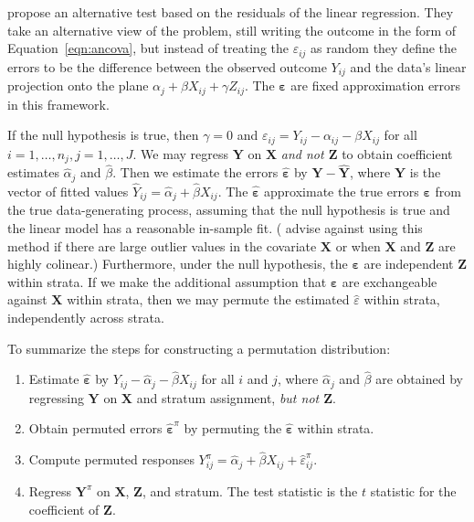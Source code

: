 \documentclass[12pt]{article}
\begin{document}
\citet{freedman_nonstochastic_1983} propose an alternative test based on the residuals of the linear regression.
They take an alternative view of the problem, still writing the outcome in the form of Equation~\ref{eqn:ancova}, but instead of treating the $\varepsilon_{ij}$ as random they define the errors to be the difference between the observed outcome $Y_{ij}$ and the data's linear projection onto the plane $\alpha_j + \beta X_{ij}+ \gamma Z_{ij}$.
The $\mathbf{\varepsilon}$ are fixed approximation errors in this framework.

If the null hypothesis is true, then $\gamma = 0$ and $\varepsilon_{ij} = Y_{ij} - \alpha_{ij} - \beta X_{ij}$ for all $i = 1, \dots, n_j, j = 1, \dots, J$.
We may regress $\mathbf{Y}$ on $\mathbf{X}$ \textit{and not $\mathbf{Z}$} to obtain coefficient estimates $\hat{\alpha}_j$ and $\hat{\beta}$.
Then we estimate the errors $\mathbf{\hat{\varepsilon}}$ by $\mathbf{Y} - \mathbf{\hat{Y}}$, where $\mathbf{\hat{Y}}$ is the vector of fitted values $\hat{Y}_{ij} = \hat{\alpha}_j + \hat{\beta}X_{ij}$.
The $\mathbf{\hat{\varepsilon}}$ approximate the true errors $\mathbf{\varepsilon}$ from the true data-generating process, assuming that the null hypothesis is true and the linear model has a reasonable in-sample fit.
(\cite{freedman_nonstochastic_1983} advise against using this method if there are large outlier values in the covariate $\mathbf{X}$ or when $\mathbf{X}$ and $\mathbf{Z}$ are highly colinear.)
Furthermore, under the null hypothesis, the $\mathbf{\varepsilon}$ are independent $\mathbf{Z}$ within strata. 
If we make the additional assumption that $\mathbf{\varepsilon}$ are exchangeable against $\mathbf{X}$ within strata, then 
we may permute the estimated $\hat{\varepsilon}$ within strata, independently across strata.

To summarize the steps for constructing a permutation distribution:

\begin{enumerate}
\item Estimate $\mathbf{\hat{\varepsilon}}$ by $Y_{ij} - \hat{\alpha}_j - \hat{\beta} X_{ij}$ for all $i$ and $j$, where $\hat{\alpha}_j$ and $\hat{\beta}$ are obtained by regressing $\mathbf{Y}$ on $\mathbf{X}$ and stratum assignment, \textit{but not $\mathbf{Z}$}.
\item Obtain permuted errors $\mathbf{\hat{\varepsilon}}^\pi$ by permuting the $\mathbf{\hat{\varepsilon}}$ within strata.
\item Compute permuted responses $Y_{ij}^\pi = \hat{\alpha}_j + \hat{\beta} X_{ij}+ \hat{\varepsilon}_{ij}^\pi$.
\item Regress $\mathbf{Y}^\pi$ on $\mathbf{X}$, $\mathbf{Z}$, and stratum. The test statistic is the $t$ statistic for the coefficient of $\mathbf{Z}$.
\end{enumerate}
\end{document}

